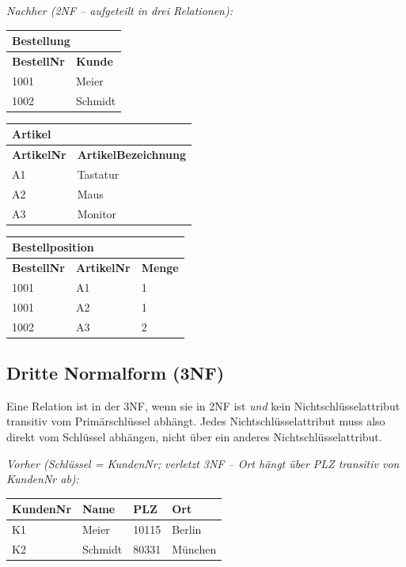 \textit{Nachher (2NF -- aufgeteilt in drei Relationen):}
\begin{center}
\begin{tabularx}{\textwidth}{l X}
  \toprule
  \multicolumn{2}{l}{\textbf{Bestellung}} \\
  \midrule
  \textbf{BestellNr} & \textbf{Kunde} \\
  \midrule
  1001 & Meier \\
  1002 & Schmidt \\
  \bottomrule
\end{tabularx}
\end{center}
\begin{center}
\begin{tabularx}{\textwidth}{l X}
  \toprule
  \multicolumn{2}{l}{\textbf{Artikel}} \\
  \midrule
  \textbf{ArtikelNr} & \textbf{ArtikelBezeichnung} \\
  \midrule
  A1 & Tastatur \\
  A2 & Maus \\
  A3 & Monitor \\
  \bottomrule
\end{tabularx}
\end{center}
\begin{center}
\begin{tabularx}{\textwidth}{l l X}
  \toprule
  \multicolumn{3}{l}{\textbf{Bestellposition}} \\
  \midrule
  \textbf{BestellNr} & \textbf{ArtikelNr} & \textbf{Menge} \\
  \midrule
  1001 & A1 & 1 \\
  1001 & A2 & 1 \\
  1002 & A3 & 2 \\
  \bottomrule
\end{tabularx}
\end{center}

\subsection{Dritte Normalform (3NF)}
Eine Relation ist in der 3NF, wenn sie in 2NF ist \emph{und} kein Nichtschlüsselattribut transitiv vom Primärschlüssel abhängt. Jedes Nichtschlüsselattribut muss also direkt vom Schlüssel abhängen, nicht über ein anderes Nichtschlüsselattribut.

\textit{Vorher (Schlüssel = KundenNr; verletzt 3NF -- Ort hängt über PLZ transitiv von KundenNr ab):}
\begin{center}
\begin{tabularx}{\textwidth}{l l l X}
  \toprule
  \textbf{KundenNr} & \textbf{Name} & \textbf{PLZ} & \textbf{Ort} \\
  \midrule
  K1 & Meier & 10115 & Berlin \\
  K2 & Schmidt & 80331 & München \\
  \bottomrule
\end{tabularx}
\end{center}

